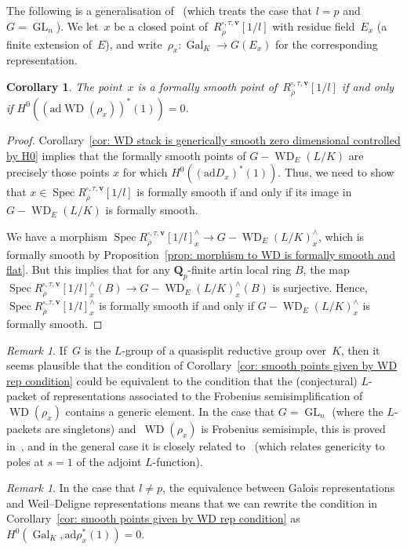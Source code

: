 \documentclass{amsart}
\renewcommand{\mathbb}{\mathbf}
\def\ad{\mathrm{ad}}
\newtheorem{cor}[subsubsection]{Corollary}
\theoremstyle{definition}
\theoremstyle{remark}
\newtheorem{rem}[subsubsection]{Remark}
\newcommand{\mar}[1]{}
\newcommand{\mar}[1]{\marginpar{\raggedright\tiny squirrel #1}}
\newcommand{\Q}{\QQ}
\newcommand{\QQ}{{\mathbb Q}}
\newcommand{\Qp}{\Q_p}
\DeclareMathOperator{\Gal}{Gal}
\DeclareMathOperator{\GL}{GL}
\DeclareMathOperator{\Spec}{Spec}
\DeclareMathOperator{\WD}{WD}
\newcommand{\rhobar}{\overline{\rho}}
\begin{document}
The following is a generalisation of~\cite[Thm.\
D]{allen2014deformations} (which treats the case that $l=p$ and
$G=\GL_n$). We let~$x$ be a closed point
of~$R_{\rhobar}^{\square,\tau,\mathbf{v}}[1/l]$ with residue
field~$E_x$ (a finite extension of~$E$), and write~$\rho_x:\Gal_K\to
G(E_x)$ for the corresponding representation.
\begin{cor}
  \label{cor: smooth points given by WD rep condition}%
The point~$x$ is a formally smooth point
of~$R_{\rhobar}^{\square,\tau,\mathbf{v}}[1/l]$ if and only if $H^0((\ad\WD(\rho_x))^*(1))=0$.
\end{cor}
\begin{proof}%
Corollary~\ref{cor: WD stack is generically smooth zero dimensional controlled by H0} implies that the formally smooth points of $G-\WD_E(L/K)$ are precisely those points $x$ for which $H^0((\ad D_x)^*(1))$.  Thus, we need to show that $x\in\Spec R_{\rhobar}^{\square,\tau,\mathbf{v}}[1/l]$ is formally smooth if and only if its image in $G-\WD_E(L/K)$ is formally smooth.

We have a morphism $\Spec R_{\rhobar}^{\square,\tau,\mathbf{v}}[1/l]_x^\wedge\rightarrow G-\WD_E(L/K)_x^\wedge$, which is formally smooth by Proposition~\ref{prop: morphism to WD is formally smooth and flat}.  But this implies that for any $\Qp$-finite artin local ring $B$, the map $\Spec R_{\rhobar}^{\square,\tau,\mathbf{v}}[1/l]_x^\wedge(B)\rightarrow G-\WD_E(L/K)_x^\wedge(B)$ is surjective.  Hence, $\Spec R_{\rhobar}^{\square,\tau,\mathbf{v}}[1/l]_x^\wedge$ is formally smooth if and only if $G-\WD_E(L/K)_x^\wedge$ is formally smooth.
\end{proof}

\begin{rem}
  \label{rem: smooth equals generic}If~$G$ is the $L$-group of a
  quasisplit reductive group over~$K$, then it seems plausible that
  the condition of Corollary~\ref{cor: smooth points given by WD rep
    condition} could be equivalent to the condition that the
  (conjectural) $L$-packet of representations associated to the
  Frobenius semisimplification of
  $\WD(\rho_x)$ contains a generic element. In the case that
  $G=\GL_n$ (where the $L$-packets are singletons) and~$\WD(\rho_x)$
  is Frobenius semisimple, this is proved
  in~\cite[\S1]{allen2014deformations}, and in the general case it is
  closely related to~\cite[Conj.\ 2.6]{MR1186476} (which relates
  genericity to poles at $s=1$ of the adjoint $L$-function).
\end{rem}
\begin{rem}
  In the case that $l\ne p$, the equivalence between Galois
  representations and Weil--Deligne representations means that we can
  rewrite the condition in Corollary~\ref{cor: smooth points given by
    WD rep condition} as $H^0(\Gal_K,\ad\rho_x^*(1))=0$.
\end{rem}
\end{document}
